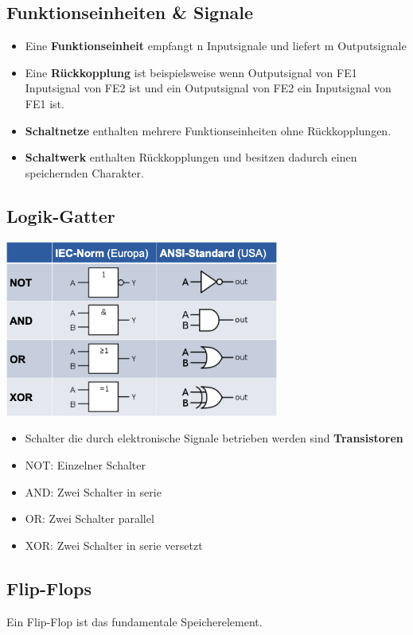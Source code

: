 \documentclass[8pt,a4paper]{scrartcl}
\begin{document}
\begin{multicols*}{3}
			\subsection{Funktionseinheiten \& Signale}
				\begin{itemize}\itemsep0pt
					\item Eine \textbf{Funktionseinheit} empfangt n Inputsignale und liefert m Outputsignale
					\item Eine \textbf{Rückkopplung} ist beispielsweise wenn Outputsignal von FE1 Inputsignal von FE2 ist und ein Outputsignal von FE2 ein Inputsignal von FE1 ist.
					\item \textbf{Schaltnetze} enthalten mehrere Funktionseinheiten ohne Rückkopplungen.
					\item \textbf{Schaltwerk} enthalten Rückkopplungen und besitzen dadurch einen speichernden Charakter.
				\end{itemize}
			\subsection{Logik-Gatter}
				\includegraphics[height=5.8cm]{img/digitaleGrundbausteine.png} 
				\begin{itemize}\itemsep0pt
					\item Schalter die durch elektronische Signale betrieben werden sind \textbf{Transistoren}
					\item NOT: Einzelner Schalter
					\item AND: Zwei Schalter in serie
					\item OR: Zwei Schalter parallel
					\item XOR: Zwei Schalter in serie versetzt
				\end{itemize}
			
			\subsection{Flip-Flops}
			Ein Flip-Flop ist das fundamentale Speicherelement.

\end{multicols*}
\end{document}
